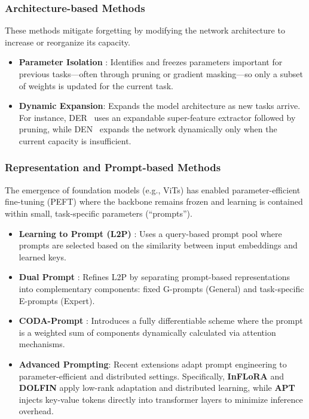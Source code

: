 \subsubsection{Architecture-based Methods}
These methods mitigate forgetting by modifying the network architecture to increase or reorganize its capacity.
\begin{itemize}
	\item \textbf{Parameter Isolation} \cite{10.5555/3454287.3455512}: Identifies and freezes parameters important for previous tasks---often through pruning or gradient masking---so only a subset of weights is updated for the current task.
	\item \textbf{Dynamic Expansion}: Expands the model architecture as new tasks arrive. For instance, DER~\cite{Yan2021DERDE} uses an expandable super-feature extractor followed by pruning, while DEN~\cite{Yoon2017LifelongLW} expands the network dynamically only when the current capacity is insufficient.
\end{itemize}

\subsubsection{Representation and Prompt-based Methods}
The emergence of foundation models (e.g., ViTs) has enabled parameter-efficient fine-tuning (PEFT) where the backbone remains frozen and learning is contained within small, task-specific parameters (``prompts'').
\begin{itemize}
	\item \textbf{Learning to Prompt (L2P)} \cite{wang2022learning}: Uses a query-based prompt pool where prompts are selected based on the similarity between input embeddings and learned keys.
	\item \textbf{Dual Prompt} \cite{wang2022dualprompt}: Refines L2P by separating prompt-based representations into complementary components: fixed G-prompts (General) and task-specific E-prompts (Expert).
	\item \textbf{CODA-Prompt} \cite{Smith_2023_CVPR}: Introduces a fully differentiable scheme where the prompt is a weighted sum of components dynamically calculated via attention mechanisms.
	\item \textbf{Advanced Prompting}: Recent extensions adapt prompt engineering to parameter-efficient and distributed settings. Specifically, \textbf{InFLoRA} \cite{liang2024inflora} and \textbf{DOLFIN} \cite{dolfin} apply low-rank adaptation and distributed learning, while \textbf{APT} \cite{Chen_2025_ICCV} injects key-value tokens directly into transformer layers to minimize inference overhead.
\end{itemize}

